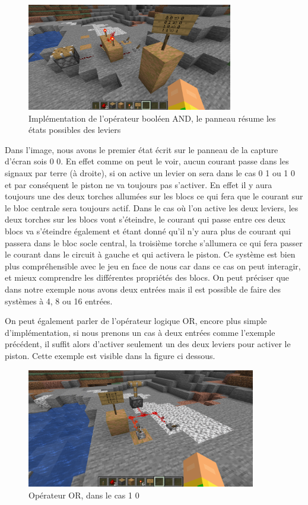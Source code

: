 \begin{figure}[!htb]
  \centering
  \includegraphics[width=90mm,scale=0.5]{images/minecraft4.png}
  \caption{Implémentation de l'opérateur booléen AND, le panneau résume les états possibles des leviers}
  \label{fig:boat1}
\end{figure}

Dans l'image, nous avons le premier état écrit sur le panneau de la capture d'écran sois 0 0. En effet comme on peut le voir, aucun courant passe dans les signaux par terre (à droite), si on active un levier on sera dans le cas 0 1 ou 1 0 et par conséquent le piston ne va toujours pas s'activer. En effet il y aura toujours une des deux torches allumées sur les blocs ce qui fera que le courant sur le bloc centrale sera toujours actif. Dans le cas où l'on active les deux leviers, les deux torches sur les blocs vont s'éteindre, le courant qui passe entre ces deux blocs va s'éteindre également et étant donné qu'il n'y aura plus de courant qui passera dans le bloc socle central, la troisième torche s'allumera ce qui fera passer le courant dans le circuit à gauche et qui activera le piston. Ce système est bien plus compréhensible avec le jeu en face de nous car dans ce cas on peut interagir, et mieux comprendre les différentes propriétés des blocs. On peut préciser que dans notre exemple nous avons deux entrées mais il est possible de faire des systèmes à 4, 8 ou 16 entrées.

On peut également parler de l'opérateur logique OR, encore plus simple d'implémentation, si nous prenons un cas à deux entrées comme l'exemple précédent, il suffit alors d'activer seulement un des deux leviers pour activer le piston. Cette exemple est visible dans la figure ci dessous.

\newpage

\begin{figure}[!htb]
  \centering
  \includegraphics[width=100mm,scale=0.5]{images/minecraft5.png}
  \caption{Opérateur OR, dans le cas 1 0}
  \label{fig:boat1}
\end{figure}

